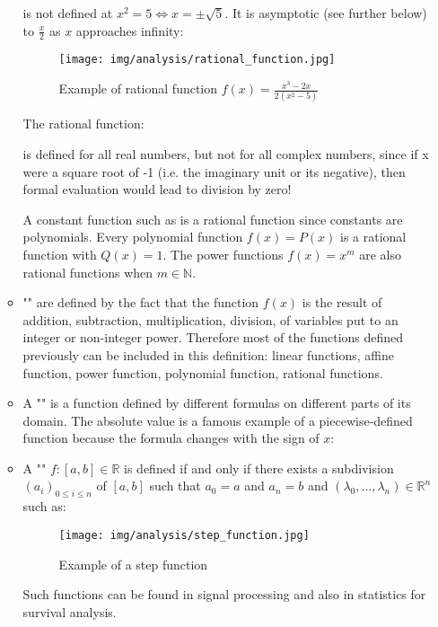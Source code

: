 \begin{enumerate}
\begin{itemize}
			is not defined at $x^2=5 \Leftrightarrow x=\pm \sqrt{5}$. It is asymptotic (see further below) to $\frac{x}{2}$ as $x$ approaches infinity:
			\begin{figure}[H]
				\centering
				\texttt{[image: img/analysis/rational\_function.jpg]}
				\caption[Example of rational function]{Example of rational function $f(x) = \frac{x^3-2x}{2(x^2-5)}$}
			\end{figure}
			The rational function:
			
			 is defined for all real numbers, but not for all complex numbers, since if x were a square root of -1 (i.e. the imaginary unit or its negative), then formal evaluation would lead to division by zero!
			 
			 A constant function such as is a rational function since constants are polynomials. Every polynomial function $f(x) = P(x)$ is a rational function with $Q(x) = 1$. The power functions $f(x)=x^m$ are also rational functions when $m\in\mathbb{N}$.
			 
			 \item "" are defined by the fact that the function $f(x)$ is the result of addition, subtraction, multiplication, division, of variables put to an integer or non-integer power. Therefore most of the functions defined previously can be included in this definition: linear functions, affine function, power function, polynomial function, rational functions.
			 
			 \item A "" is a function defined by different formulas on different parts of its domain. The absolute value is a famous example of a piecewise-defined function because the formula changes with the sign of $x$:
			 
			 
			 \item A "" $f:[a,b]\in \mathbb{R}$ is defined if and only if there exists a subdivision $(a_i)_{0\leq i \leq n}$ of $[a, b]$ such that $a_0=a$ and $a_n=b$ and $(\lambda_0,...,\lambda_n)\in \mathbb{R}^n$ such as:
			 
			\begin{figure}[H]
				\centering
				\texttt{[image: img/analysis/step\_function.jpg]}
				\caption{Example of a step function}
			\end{figure}
			Such functions can be found in signal processing and also in statistics for survival analysis.
		\end{itemize}
		

\end{enumerate}
